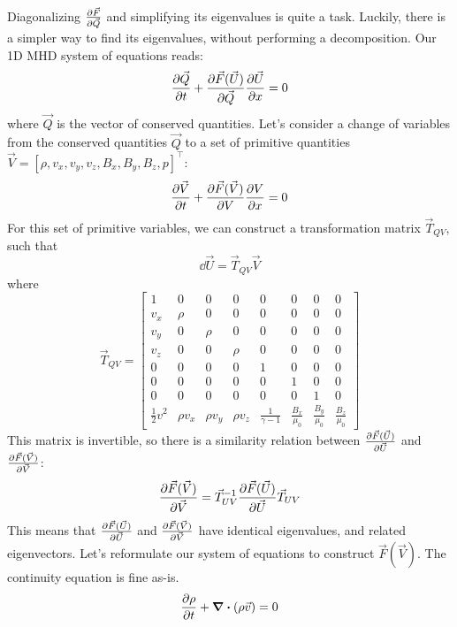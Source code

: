 \documentclass[%
 reprint,
 amsmath,amssymb,
 aps,
]{revtex4-2}
\begin{document}
Diagonalizing $\pdv{\vec F}{\vec Q}$ and simplifying its eigenvalues is quite a task. Luckily, there is a simpler way to find its eigenvalues, without performing a decomposition. Our 1D MHD system of equations reads:
\begin{equation}
\pdv{\vec Q}{t} + \pdv{\vec F(\vec U)}{\vec Q} \pdv{\vec U}{x} = 0
\end{equation}
where $\vec Q$ is the vector of conserved quantities. Let's consider a change of variables from the conserved quantities $\vec Q$ to a set of primitive quantities $\vec V = [\rho, v_x, v_y, v_z, B_x, B_y, B_z, p]^\top$:
\begin{equation}
\pdv{\vec V}{t} + \pdv{ \vec F(\vec V)}{V} \pdv{V}{x} = 0
\end{equation}
For this set of primitive variables, we can construct a transformation matrix $\vec T_{QV}$, such that
\begin{equation}
\dd \vec U = \vec T_{QV} \vec V
\end{equation}
where
\begin{equation}
\vec T_{QV} = \begin{bmatrix}
1 & 0 & 0 & 0 & 0 & 0 & 0 & 0 \\
v_x & \rho & 0 & 0 & 0 & 0 & 0 & 0\\
v_y & 0 & \rho & 0 & 0 & 0 & 0 & 0\\
v_z & 0 & 0 & \rho & 0 & 0 & 0 & 0 \\
0 & 0 & 0 & 0 & 1 & 0 & 0 & 0\\
0 & 0 & 0 & 0 & 0 & 1 & 0 & 0 \\
0 & 0 & 0 & 0 & 0 & 0 & 1 & 0\\
\frac{1}{2} v^2 & \rho v_x & \rho v_y & \rho v_z & \frac{1}{\gamma - 1} & \frac{B_x}{\mu_0} & \frac{B_y}{\mu_0} & \frac{B_z}{\mu_0}
\end{bmatrix}
\end{equation}
This matrix is invertible, so there is a similarity relation between $\pdv{\vec F( \vec U)}{\vec U}$ and $\pdv{\vec F(\vec V)}{\vec V}$:
\begin{equation}
\pdv{\vec F(\vec V)}{\vec V} = \vec T_{UV} ^{-1} \pdv{ \vec F(\vec U)}{\vec U} \vec T_{UV}
\end{equation}
This means that $\pdv{\vec F( \vec U)}{\vec U}$ and $\pdv{\vec F(\vec V)}{\vec V}$ have identical eigenvalues, and related eigenvectors. Let's reformulate our system of equations to construct $\vec F(\vec V)$. The continuity equation is fine as-is. 
\begin{equation}
\pdv{\rho}{t} + \div (\rho \vec v) = 0
\end{equation}
\end{document}
